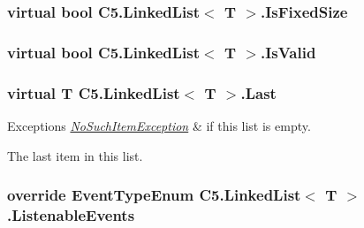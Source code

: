 \subsubsection[{Is\+Fixed\+Size}]{\setlength{\rightskip}{0pt plus 5cm}virtual bool {\bf C5.\+Linked\+List}$<$ T $>$.Is\+Fixed\+Size\hspace{0.3cm}{\ttfamily [get]}}\label{class_c5_1_1_linked_list_ab20e4a1a12a710451376c6c596123f0a}




\hypertarget{class_c5_1_1_linked_list_af53b6f41455420820708c503dd6c5038}{}
\subsubsection[{Is\+Valid}]{\setlength{\rightskip}{0pt plus 5cm}virtual bool {\bf C5.\+Linked\+List}$<$ T $>$.Is\+Valid\hspace{0.3cm}{\ttfamily [get]}}\label{class_c5_1_1_linked_list_af53b6f41455420820708c503dd6c5038}




\hypertarget{class_c5_1_1_linked_list_a7070dde3b79d8031dfd0a708c660f02d}{}
\subsubsection[{Last}]{\setlength{\rightskip}{0pt plus 5cm}virtual T {\bf C5.\+Linked\+List}$<$ T $>$.Last\hspace{0.3cm}{\ttfamily [get]}}\label{class_c5_1_1_linked_list_a7070dde3b79d8031dfd0a708c660f02d}





\begin{DoxyExceptions}{Exceptions}
{\em \hyperlink{class_c5_1_1_no_such_item_exception}{No\+Such\+Item\+Exception}} & if this list is empty.\\
\hline
\end{DoxyExceptions}


The last item in this list.\hypertarget{class_c5_1_1_linked_list_a74b0982297f6197bdac1720f4d8c4d05}{}
\subsubsection[{Listenable\+Events}]{\setlength{\rightskip}{0pt plus 5cm}override {\bf Event\+Type\+Enum} {\bf C5.\+Linked\+List}$<$ T $>$.Listenable\+Events\hspace{0.3cm}{\ttfamily [get]}}\label{class_c5_1_1_linked_list_a74b0982297f6197bdac1720f4d8c4d05}




